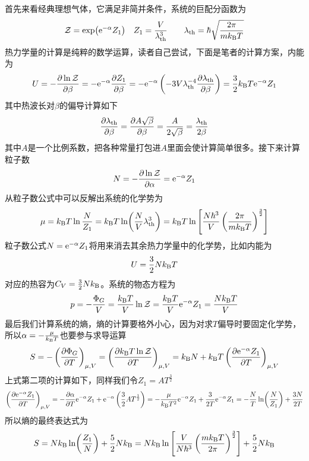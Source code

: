 \documentclass[../../main.tex]{subfiles}
\begin{document}
首先来看经典理想气体，它满足非简并条件，系统的巨配分函数为
\begin{equation}
    \mathcal{Z}=\exp(\mathrm{e}^{-\alpha}Z_1)\quad Z_1=\frac{V}{\lambda_{\text{th}}^3}\qquad \lambda_{\text{th}}=\hbar\sqrt{\frac{2\pi}{mk_{\mathrm{B}} T}}
\end{equation}
热力学量的计算是纯粹的数学运算，读者自己尝试，下面是笔者的计算方案，内能为
\begin{equation}
    U=-\pdv{\ln\mathcal{Z}}{\beta}=-\mathrm{e}^{-\alpha}\pdv{Z_1}{\beta}=-\mathrm{e}^{-\alpha}\left(-3V\lambda_{\mathrm{th}}^{-4}\pdv{\lambda_{\mathrm{th}}}{\beta}\right)=\frac{3}{2}k_{\mathrm{B}} T\mathrm{e}^{-\alpha}Z_1
\end{equation}
其中热波长对\(\beta\)的偏导计算如下
\begin{equation}
    \pdv{\lambda_{\mathrm{th}}}{\beta}=\pdv{A\sqrt{\beta}}{\beta}=\frac{A}{2\sqrt{\beta}}=\frac{\lambda_{\mathrm{th}}}{2\beta}
\end{equation}
其中\(A\)是一个比例系数，把各种常量打包进\(A\)里面会使计算简单很多。接下来计算粒子数
\begin{equation}
    N=-\pdv{\ln\mathcal{Z}}{\alpha}=\mathrm{e}^{-\alpha}Z_1
\end{equation}
从粒子数公式中可以反解出系统的化学势为
\begin{equation}
    \mu=k_{\mathrm{B}} T\ln\frac{N}{Z_1}=k_{\mathrm{B}} T\ln(\frac{N}{V}\lambda_{\mathrm{th}}^3)=k_{\mathrm{B}} T\ln\left[\frac{N\hbar^3}{V}\left(\frac{2\pi}{mk_{\mathrm{B}} T}\right)^{\frac{3}{2}}\right]
\end{equation}
粒子数公式\(N=\mathrm{e}^{-\alpha}Z_1\)将用来消去其余热力学量中的化学势，比如内能为
\begin{equation}
    U=\frac{3}{2}Nk_{\mathrm{B}} T
\end{equation}
对应的热容为\(C_V=\frac{3}{2}Nk_{\mathrm{B}}\)。系统的物态方程为
\begin{equation}
    p=-\frac{\Phi_{G}}{V}=\frac{k_{\mathrm{B}} T}{V}\ln\mathcal{Z}=\frac{k_{\mathrm{B}} T}{V}\mathrm{e}^{-\alpha}Z_1=\frac{Nk_{\mathrm{B}} T}{V}
\end{equation}
最后我们计算系统的熵，熵的计算要格外小心，因为对求\(T\)偏导时要固定化学势，所以\(\alpha=-\frac{\mu}{k_{\mathrm{B}} T}\)也要参与求导运算
\begin{equation}
    S=-\left(\pdv{\Phi_{G}}{T}\right)_{\mu,V}=\left(\pdv{k_{\mathrm{B}}T\ln\mathcal{Z}}{T}\right)_{\mu,V}=k_{\mathrm{B}} N+k_{\mathrm{B}} T\left(\pdv{\mathrm{e}^{-\alpha}Z_1}{T}\right)_{\mu,V}
\end{equation}
上式第二项的计算如下，同样我们令\(Z_1=AT^{\frac{3}{2}}\)
\begin{equation}
    \left(\pdv{\mathrm{e}^{-\alpha}Z_1}{T}\right)_{\mu,V}=-\pdv{\alpha}{T}\mathrm{e}^{-\alpha}Z_1+\mathrm{e}^{-\alpha}\left(\frac{3}{2}AT^{\frac{1}{2}}\right)=-\frac{\mu}{k_{\mathrm{B}} T^2}\mathrm{e}^{-\alpha}Z_1+\frac{3}{2T}\mathrm{e}^{-\alpha}Z_1=-\frac{N}{T}\ln(\frac{N}{Z_1})+\frac{3N}{2T}
\end{equation}
所以熵的最终表达式为
\begin{equation}
    S=Nk_{\mathrm{B}}\ln(\frac{Z_1}{N})+\frac{5}{2}Nk_{\mathrm{B}}=Nk_{\mathrm{B}}\ln\left[\frac{V}{N\hbar^3}\left(\frac{mk_{\mathrm{B}} T}{2\pi}\right)^{\frac{3}{2}}\right]+\frac{5}{2}Nk_{\mathrm{B}}
\end{equation}
\end{document}
